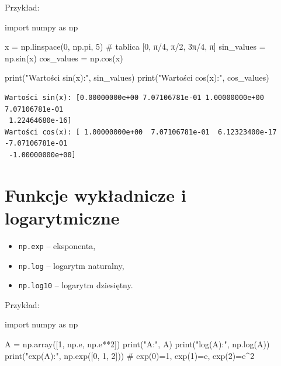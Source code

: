 \documentclass[
  polish,
  letterpaper,
  DIV=11,
  numbers=noendperiod]{scrreprt}
\newenvironment{Shaded}{\begin{snugshade}}{\end{snugshade}}
\newcommand{\BuiltInTok}[1]{\textcolor[rgb]{0.00,0.23,0.31}{#1}}
\newcommand{\CommentTok}[1]{\textcolor[rgb]{0.37,0.37,0.37}{#1}}
\newcommand{\DecValTok}[1]{\textcolor[rgb]{0.68,0.00,0.00}{#1}}
\newcommand{\ImportTok}[1]{\textcolor[rgb]{0.00,0.46,0.62}{#1}}
\newcommand{\NormalTok}[1]{\textcolor[rgb]{0.00,0.23,0.31}{#1}}
\newcommand{\OperatorTok}[1]{\textcolor[rgb]{0.37,0.37,0.37}{#1}}
\newcommand{\StringTok}[1]{\textcolor[rgb]{0.13,0.47,0.30}{#1}}
\providecommand{\tightlist}{%
  \setlength{\itemsep}{0pt}\setlength{\parskip}{0pt}}
\begin{document}
Przykład:

\begin{Shaded}
\begin{Highlighting}[]
\ImportTok{import}\NormalTok{ numpy }\ImportTok{as}\NormalTok{ np}

\NormalTok{x }\OperatorTok{=}\NormalTok{ np.linspace(}\DecValTok{0}\NormalTok{, np.pi, }\DecValTok{5}\NormalTok{) }\CommentTok{\# tablica [0, π/4, π/2, 3π/4, π]}
\NormalTok{sin\_values }\OperatorTok{=}\NormalTok{ np.sin(x)}
\NormalTok{cos\_values }\OperatorTok{=}\NormalTok{ np.cos(x)}

\BuiltInTok{print}\NormalTok{(}\StringTok{"Wartości sin(x):"}\NormalTok{, sin\_values)}
\BuiltInTok{print}\NormalTok{(}\StringTok{"Wartości cos(x):"}\NormalTok{, cos\_values)}
\end{Highlighting}
\end{Shaded}

\begin{verbatim}
Wartości sin(x): [0.00000000e+00 7.07106781e-01 1.00000000e+00 7.07106781e-01
 1.22464680e-16]
Wartości cos(x): [ 1.00000000e+00  7.07106781e-01  6.12323400e-17 -7.07106781e-01
 -1.00000000e+00]
\end{verbatim}

\section{Funkcje wykładnicze i
logarytmiczne}\label{funkcje-wykux142adnicze-i-logarytmiczne}

\begin{itemize}
\tightlist
\item
  \texttt{np.exp} -- eksponenta,
\item
  \texttt{np.log} -- logarytm naturalny,
\item
  \texttt{np.log10} -- logarytm dziesiętny.
\end{itemize}

Przykład:

\begin{Shaded}
\begin{Highlighting}[]
\ImportTok{import}\NormalTok{ numpy }\ImportTok{as}\NormalTok{ np}

\NormalTok{A }\OperatorTok{=}\NormalTok{ np.array([}\DecValTok{1}\NormalTok{, np.e, np.e}\OperatorTok{**}\DecValTok{2}\NormalTok{])}
\BuiltInTok{print}\NormalTok{(}\StringTok{"A:"}\NormalTok{, A)}
\BuiltInTok{print}\NormalTok{(}\StringTok{"log(A):"}\NormalTok{, np.log(A))}
\BuiltInTok{print}\NormalTok{(}\StringTok{"exp(A):"}\NormalTok{, np.exp([}\DecValTok{0}\NormalTok{, }\DecValTok{1}\NormalTok{, }\DecValTok{2}\NormalTok{]))  }\CommentTok{\# exp(0)=1, exp(1)=e, exp(2)=e\^{}2}
\end{Highlighting}
\end{Shaded}
\end{document}
